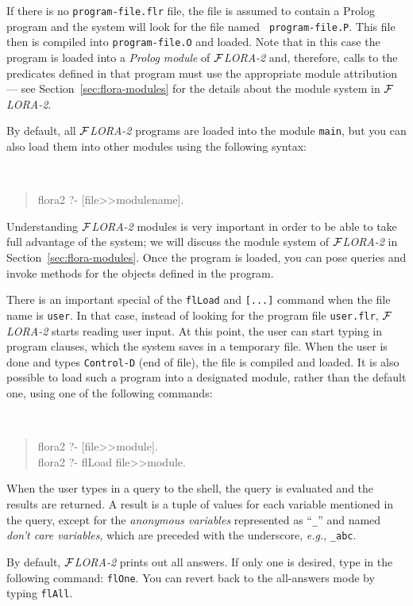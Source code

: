 \documentclass[11pt]{article}
\newcommand{\FLORA}{{\mbox{${\cal F}${\small\it LORA}\rm\emph{-2}}}\xspace}
\begin{document}
If there is no {\tt program-file.flr} file, the file is assumed to contain
a Prolog program and the system will look for the file named {\tt
  program-file.P}. This file then is compiled into {\tt program-file.O} and
loaded. Note that in this case the program is loaded into a {\em Prolog
  module} of \FLORA and, therefore, calls to the predicates defined in that
program must use the appropriate module attribution --- see
Section~\ref{sec:flora-modules} for the details about the module system in
\FLORA.

By default, all \FLORA programs are loaded into the module {\tt main}, but
you can also load them into other modules using the following syntax:
{\tt
\begin{quote}
 flora2 ?-  [file>>modulename].
\end{quote}
}
Understanding \FLORA modules is very important in order to be able to take
full advantage of the system; we will discuss the module system of \FLORA
in Section~\ref{sec:flora-modules}.  Once the program is loaded, you can
pose queries and invoke methods for the objects defined in the program.

There is an important special of the {\tt flLoad} and {\tt [...]} command
when the file name is {\tt user}. In that case, instead of looking for the
program file {\tt user.flr}, \FLORA starts reading user input. At this
point, the user can start typing in program clauses, which the system saves
in a temporary file. When the user is done and types {\tt Control-D} (end
of file), the file is compiled and loaded. It is also possible to load such
a program into a designated module, rather than the default one,
using one of the following commands:
{\tt
\begin{quote}
  flora2 ?- [file>>module].\\
  flora2 ?- flLoad file>>module.
\end{quote}
}

When the user types in a query to the shell, the query is evaluated and the
results are returned. A result is a tuple of values for each variable
mentioned in the query, except for the \emph{anonymous variables}
represented as ``{\tt \_}'' and named {\em don't care variables}, which are
preceded with the underscore, {\it e.g.}, {\tt \_abc}.

By default, \FLORA prints out all answers. If only one is desired, type in
the following command: {\tt flOne}. You can revert back to the all-answers
mode by typing {\tt flAll}.
\end{document}
